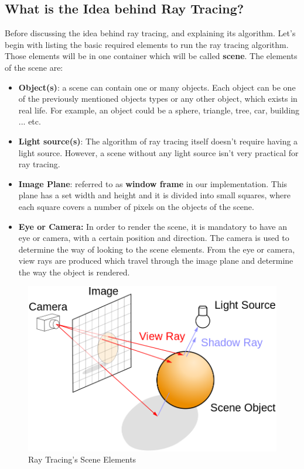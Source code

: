 \documentclass[a4paper]{article}
\begin{document}
	\subsection{What is the Idea behind  Ray Tracing?}
	Before discussing the idea behind ray tracing, and explaining its algorithm. Let's begin with listing the basic required elements to run the ray tracing algorithm. Those elements will be in one container which will be called \textbf{scene}. The elements of the scene are:
	\begin{itemize}
		\item \textbf{Object(s)}: a scene can contain one or many objects. Each object can be one of the previously mentioned objects types or any other object, which exists in real life. For example, an object could be a sphere, triangle, tree, car, building ... etc.
		\item \textbf{Light source(s)}: The algorithm of ray tracing itself doesn't require having a light source. However, a scene without any light source isn't very practical for ray tracing.
		\item \textbf{Image Plane}: referred to as \textbf{window frame} in our implementation. This plane has a set width and height and it is divided into small squares, where each square covers a number of pixels on the objects of the scene.
		\item \textbf{Eye or Camera:} In order to render the scene, it is mandatory to have an eye or camera, with a certain position and direction. The camera is used to determine the way of looking to the scene elements. From the eye or camera, view rays are produced which travel through the image plane and determine the way the object is rendered.
		
	\end{itemize}
	\begin{figure}[ht!]
		\centering
		\includegraphics[scale=0.30]{./raytracing.png}
		\caption{Ray Tracing's Scene Elements \cite{raytracingpic}}
		\label{fig:raytracing}
	\end{figure}
\end{document}
